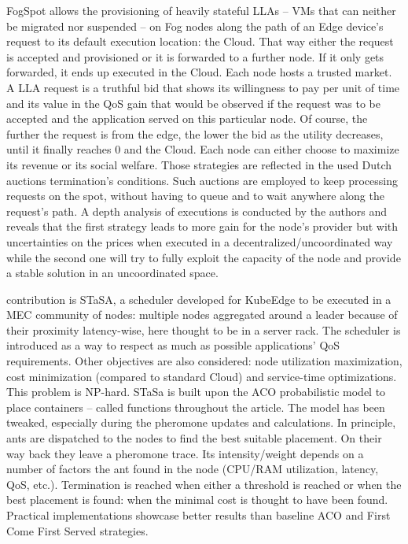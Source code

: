 \begin{description}[leftmargin=10pt]
	\item[\citeposs{tasiopoulos_fogspot_2019}] FogSpot allows the provisioning of heavily stateful \glspl{LLA} -- \glspl{VM} that can neither be migrated nor suspended -- on Fog nodes along the path of an Edge device's request to its default execution location: the Cloud. That way either the request is accepted and provisioned or it is forwarded to a further node. If it only gets forwarded, it ends up executed in the Cloud.
	Each node hosts a trusted market. A \gls{LLA} request is a truthful bid that shows its willingness to pay per unit of time and its value in the \gls{QoS} gain that would be observed if the request was to be accepted and the application served on this particular node. Of course, the further the request is from the edge, the lower the bid as the utility decreases, until it finally reaches 0 and the Cloud.
	Each node can either choose to maximize its revenue or its social welfare. Those strategies are reflected in the used Dutch auctions termination's conditions. Such auctions are employed to keep processing requests on the spot, without having to queue and to wait anywhere along the request's path. A depth analysis of executions is conducted by the authors and reveals that the first strategy leads to more gain for the node's provider but with uncertainties on the prices when executed in a decentralized/uncoordinated way while the second one will try to fully exploit the capacity of the node and provide a stable solution in an uncoordinated space.
	
	\item[\citeposs{mutichiro_qos-based_2021}] contribution is STaSA, a scheduler developed for KubeEdge to be executed in a \gls{MEC} community of nodes: multiple nodes aggregated around a leader because of their proximity latency-wise, here thought to be in a server rack. The scheduler is introduced as a way to respect as much as possible applications' \gls{QoS} requirements. Other objectives are also considered: node utilization maximization, cost minimization (compared to standard Cloud) and service-time optimizations. This problem is NP-hard. STaSa is built upon the \gls{ACO} probabilistic model to place containers -- called functions throughout the article. The model has been tweaked, especially during the pheromone updates and calculations. In principle, ants are dispatched to the nodes to find the best suitable placement. On their way back they leave a pheromone trace. Its intensity/weight depends on a number of factors the ant found in the node (CPU/RAM utilization, latency, \gls{QoS}, etc.). Termination is reached when either a threshold is reached or when the best placement is found: when the minimal cost is thought to have been found. Practical implementations showcase better results than baseline \gls{ACO} and First Come First Served strategies.
	

\end{description}
